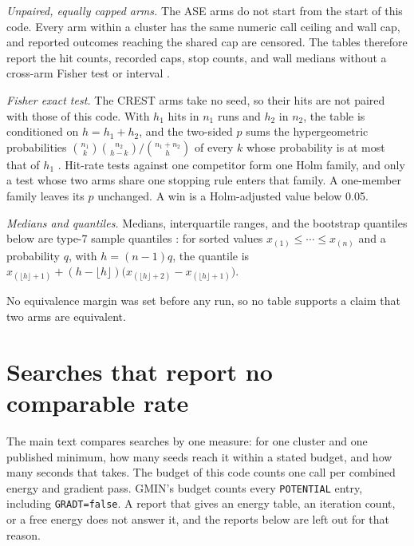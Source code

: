 \documentclass[journal=jctcce,manuscript=suppinfo]{achemso}
\begin{document}
\emph{Unpaired, equally capped arms.}
The ASE arms do not start from the start of this code.
Every arm within a cluster has the same numeric call ceiling and wall cap,
and reported outcomes reaching the shared cap are censored.
The tables therefore report the hit counts, recorded caps, stop counts, and
wall medians without a cross-arm Fisher test or interval
\cite{fisherLogicInductiveInference1935}.

\emph{Fisher exact test.}
The CREST arms take no seed, so their hits are not paired with those of
this code.
With \(h_1\) hits in \(n_1\) runs and \(h_2\) in \(n_2\), the table is
conditioned on \(h=h_1+h_2\), and the two-sided \(p\) sums the
hypergeometric probabilities
\(\binom{n_1}{k}\binom{n_2}{h-k}/\binom{n_1+n_2}{h}\) of every \(k\) whose
probability is at most that of \(h_1\)
\cite{fisherLogicInductiveInference1935}.
Hit-rate tests against one competitor form one Holm family, and only a
test whose two arms share one stopping rule enters that family.
A one-member family leaves its \(p\) unchanged.
A win is a Holm-adjusted value below 0.05.

\emph{Medians and quantiles.}
Medians, interquartile ranges, and the bootstrap quantiles below are type-7
sample quantiles \cite{hyndmanSampleQuantiles1996}: for sorted values
\(x_{(1)}\le\cdots\le x_{(n)}\) and a probability \(q\), with
\(h=(n-1)q\), the quantile is
\(x_{(\lfloor h\rfloor+1)}+(h-\lfloor h\rfloor)\bigl(x_{(\lfloor h\rfloor+2)}-x_{(\lfloor h\rfloor+1)}\bigr)\).

No equivalence margin was set before any run, so no table supports a claim
that two arms are equivalent.

\section{Searches that report no comparable rate}
\label{sec:si-related}
The main text compares searches by one measure: for one cluster and one
published minimum, how many seeds reach it within a stated budget, and how
many seconds that takes.
The budget of this code counts one call per combined energy and gradient pass.
GMIN's budget counts every \texttt{POTENTIAL} entry, including \texttt{GRADT=false}.
A report that gives an energy table, an iteration count, or a free energy
does not answer it, and the reports below are left out for that reason.
\end{document}
